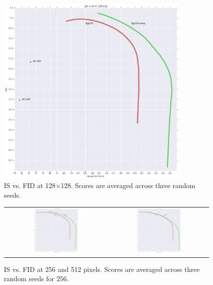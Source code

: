 \begin{figure}[htbp]
\centering
\includegraphics[width=0.85\textwidth]{images/BigGAN-deep_ISvFID_128.png} 
\caption{IS vs. FID at 128$\times$128. Scores are averaged across three random seeds.}
\label{appendix_ISvFID128}
\end{figure}


\begin{figure}[htbp]
\centering
\begin{tabular}{cc}
\includegraphics[width=0.47\textwidth]{images/BigGAN-deep_ISvFID_256.png} &
\includegraphics[width=0.47\textwidth]{images/BigGAN-deep_ISvFID_512.png} 
\end{tabular}
\caption{IS vs. FID at 256 and 512 pixels. Scores are averaged across three random seeds for 256.}%
\label{appendix_ISvFID256}
\end{figure}

